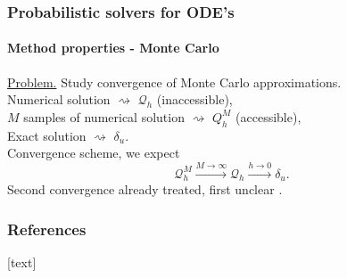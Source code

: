 \documentclass{beamer}
\begin{document}
\begin{frame}
	\frametitle{Probabilistic solvers for ODE's}
	\framesubtitle{Method properties - Monte Carlo}
	
	\underline{Problem.} Study convergence of Monte Carlo approximations. \\[0.5cm]
	Numerical solution $\rightsquigarrow$ $\mathcal Q_h$ (inaccessible), \\
	$M$ samples of numerical solution  $\rightsquigarrow$ $Q_h^M$ (accessible), \\
	Exact solution $\rightsquigarrow$ $\delta_u$. \\[0.5cm]
	
	Convergence scheme, we expect
	\begin{equation*}
	\mathcal Q_h^M \xrightarrow{M\to \infty} \mathcal Q_h \xrightarrow{h\to 0} \delta_u.
	\end{equation*}
	Second convergence already treated, first unclear \cite{KeH16}.
	
\end{frame}

\begin{frame}[allowframebreaks]
	\frametitle{References}
	
	[text]
	
	
\end{frame}
\end{document}
